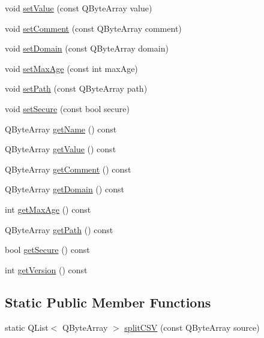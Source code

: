 \begin{DoxyCompactItemize}
void \hyperlink{class_c_w_f_1_1_http_cookie_a5a72869d830416e2cf4ad88fc8594c50}{set\+Value} (const Q\+Byte\+Array value)
\item 
void \hyperlink{class_c_w_f_1_1_http_cookie_afdc325664f2944eab395e2448d8bd44c}{set\+Comment} (const Q\+Byte\+Array comment)
\item 
void \hyperlink{class_c_w_f_1_1_http_cookie_ad8763ad422d5aa57657ddd0e339a896d}{set\+Domain} (const Q\+Byte\+Array domain)
\item 
void \hyperlink{class_c_w_f_1_1_http_cookie_ab740d39df2e55d21997a986c07eed72a}{set\+Max\+Age} (const int max\+Age)
\item 
void \hyperlink{class_c_w_f_1_1_http_cookie_a47befb40801cf96bd399183674f8e6db}{set\+Path} (const Q\+Byte\+Array path)
\item 
void \hyperlink{class_c_w_f_1_1_http_cookie_a47aee228dacdccddaf8dd10980bd38fb}{set\+Secure} (const bool secure)
\item 
Q\+Byte\+Array \hyperlink{class_c_w_f_1_1_http_cookie_a7e0e3d818e1abb1a87c27ad64d3ef1bd}{get\+Name} () const 
\item 
Q\+Byte\+Array \hyperlink{class_c_w_f_1_1_http_cookie_a6dfaa65b0fdc459987adffbb9957eb89}{get\+Value} () const 
\item 
Q\+Byte\+Array \hyperlink{class_c_w_f_1_1_http_cookie_a6cb9c628c0c9eb714945dc9227a85c03}{get\+Comment} () const 
\item 
Q\+Byte\+Array \hyperlink{class_c_w_f_1_1_http_cookie_ad50d4e09e1f63daa18887e1d5349dc1e}{get\+Domain} () const 
\item 
int \hyperlink{class_c_w_f_1_1_http_cookie_ad1e15510ff41114f5d96d17e697b3911}{get\+Max\+Age} () const 
\item 
Q\+Byte\+Array \hyperlink{class_c_w_f_1_1_http_cookie_ad34b0b8cfd90ecc2bc612c6d13227ddc}{get\+Path} () const 
\item 
bool \hyperlink{class_c_w_f_1_1_http_cookie_a1d0917c49dcd958df946c680a8a555a2}{get\+Secure} () const 
\item 
int \hyperlink{class_c_w_f_1_1_http_cookie_a7b44ee026837508edd121caf5dfd205b}{get\+Version} () const 
\end{DoxyCompactItemize}
\subsection*{Static Public Member Functions}
\begin{DoxyCompactItemize}
\item 
static Q\+List$<$ Q\+Byte\+Array $>$ \hyperlink{class_c_w_f_1_1_http_cookie_a4806d182d52218366eba504d505ec59f}{split\+C\+S\+V} (const Q\+Byte\+Array source)
\end{DoxyCompactItemize}


